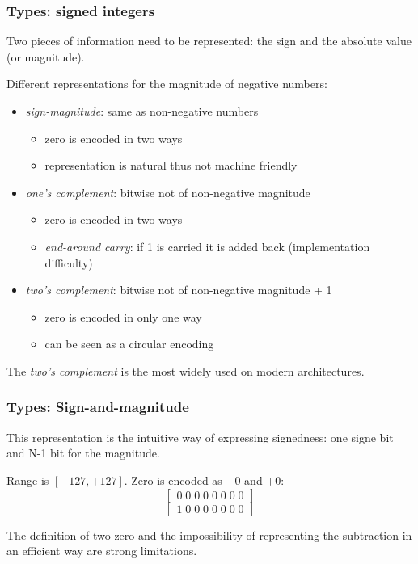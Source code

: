 \begin{frame}
  \frametitle{Types: signed integers}
Two pieces of information need to be represented: the sign and the absolute value (or magnitude). 

\medskip
Different representations for the magnitude of negative numbers:
\begin{itemize}
\item \textit{sign-magnitude}: same as non-negative numbers
\begin{itemize}
\item zero is encoded in two ways
\item representation is natural thus not machine friendly
\end{itemize}
\item \textit{one's complement}: bitwise not of non-negative magnitude
\begin{itemize}
\item zero is encoded in two ways
\item \textit{end-around carry}: if 1 is carried it is added back (implementation difficulty)
\end{itemize}
\item \textit{two's complement}: bitwise not of non-negative magnitude + 1
\begin{itemize}
\item zero is encoded in only one way
\item can be seen as a circular encoding
\end{itemize}
\end{itemize}

\medskip
The \textit{two's complement} is the most widely used on modern architectures.

\end{frame}

\begin{frame}
  \frametitle{Types: Sign-and-magnitude}
This representation is the intuitive way of expressing signedness: one signe bit and N-1 bit for the magnitude.


  \begin{center}
    
  \end{center}

Range is $[-127, +127]$.
Zero is encoded as $-0$ and $+0$:
\begin{equation*}
\begin{bmatrix}0\;0\;0\;0\;0\;0\;0\;0 \end{bmatrix}
\end{equation*}
\begin{equation*}
\begin{bmatrix}1\;0\;0\;0\;0\;0\;0\;0 \end{bmatrix}
\end{equation*}

The definition of two zero and the impossibility of representing the subtraction in an efficient way are strong limitations.

\end{frame}


